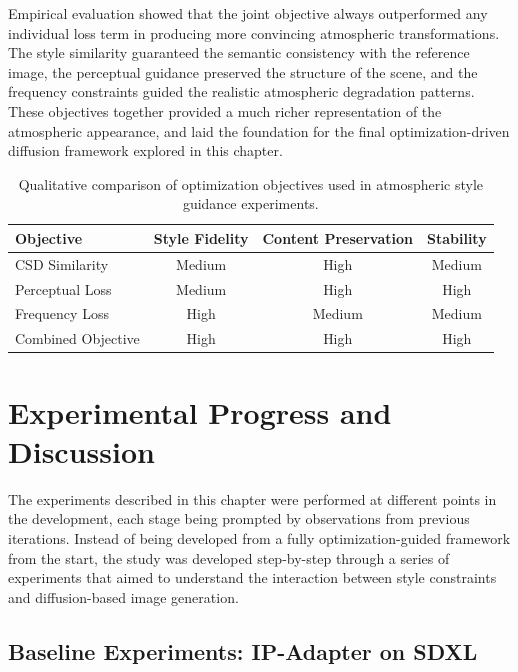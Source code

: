 Empirical evaluation showed that the joint objective always outperformed any individual loss term in producing more convincing atmospheric transformations. The style similarity guaranteed the semantic consistency with the reference image, the perceptual guidance preserved the structure of the scene, and the frequency constraints guided the realistic atmospheric degradation patterns. These objectives together provided a much richer representation of the atmospheric appearance, and laid the foundation for the final optimization-driven diffusion framework explored in this chapter.

\begin{table}[htbp]
\centering
\caption{Qualitative comparison of optimization objectives used in atmospheric style guidance experiments.}
\label{tab:objective_comparison}
\renewcommand{\arraystretch}{1.3}
\begin{tabular}{lccc}
\toprule
\textbf{Objective} & \textbf{Style Fidelity} & \textbf{Content Preservation} & \textbf{Stability} \\
\midrule
CSD Similarity & Medium & High & Medium \\
Perceptual Loss & Medium & High & High \\
Frequency Loss & High & Medium & Medium \\
Combined Objective & High & High & High \\
\bottomrule
\end{tabular}
\end{table}

\FloatBarrier
\section{Experimental Progress and Discussion}
\label{sec:ch7_experiments}

The experiments described in this chapter were performed at different points in the development, each stage being prompted by observations from previous iterations. Instead of being developed from a fully optimization-guided framework from the start, the study was developed step-by-step through a series of experiments that aimed to understand the interaction between style constraints and diffusion-based image generation.

\subsection{Baseline Experiments: IP-Adapter on SDXL}
\label{sec:ch7_sd15}

